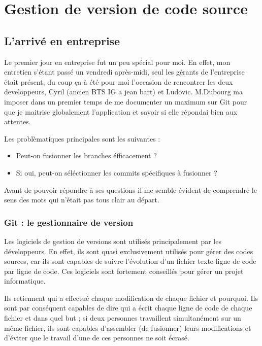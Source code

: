 \chapter{Gestion de version de code source}

\section{L'arrivé en entreprise}

Le premier jour en entreprise fut un peu spécial pour moi. En effet, mon
entretien s'étant passé un vendredi après-midi, seul les gérants de
l'entreprise était présent, du coup ça à été pour moi l'occasion de rencontrer
les deux developpeurs, Cyril (ancien BTS IG a jean bart) et Ludovic. M.Dubourg
ma imposer dans un premier temps de me documenter un maximum sur Git pour que
je maitrise globalement l'application et savoir si elle répondai bien aux
attentes.

Les problèmatiques principales sont les suivantes :
\begin{itemize}
    \item Peut-on fusionner les branches éfficacement ?
    \item Si oui, peut-on séléctionner les commits spécifiques à fusionner ?
\end{itemize}

Avant de pouvoir répondre à ses questions il me semble évident de comprendre le sens des mots qui n'était pas tous clair au départ.

\subsection{Git : le gestionnaire de version}

Les logiciels de gestion de versions sont utilisés principalement par les
développeurs. En effet, ils sont quasi exclusivement utilisés pour gérer des
codes sources, car ils sont capables de suivre l’évolution d’un fichier texte
ligne de code par ligne de code. Ces logiciels sont fortement conseillés pour
gérer un projet informatique.

Ils retiennent qui a effectué chaque modification de chaque fichier et
pourquoi. Ils sont par conséquent capables de dire qui a écrit chaque ligne de
code de chaque fichier et dans quel but ; si deux personnes travaillent
simultanément sur un même fichier, ils sont capables d’assembler (de fusionner)
leurs modifications et d’éviter que le travail d’une de ces personnes ne soit
écrasé.


